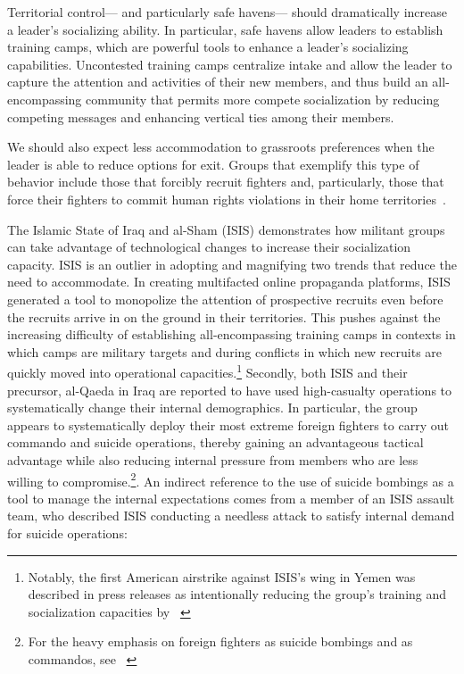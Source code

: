 Territorial control--- and particularly safe havens--- should dramatically increase a leader's socializing ability. In particular, safe havens allow leaders to establish training camps, which are powerful tools to enhance a leader's socializing capabilities. Uncontested training camps centralize intake and allow the leader to capture the attention and activities of their new members, and thus build an all-encompassing community that permits more compete socialization by reducing competing messages and enhancing vertical ties among their members.

We should also expect less accommodation to grassroots preferences when the leader is able to reduce options for exit. Groups that exemplify this type of behavior include those that forcibly recruit fighters and, particularly, those that force their fighters to commit human rights violations in their home territories~\autocite{beber2010industrial, dudenhoefer2016understanding, eck2014coercion, gates2017membership, peters2011group}.

The Islamic State of Iraq and al-Sham (ISIS) demonstrates how militant groups can take advantage of technological changes to increase their socialization capacity. ISIS is an outlier in adopting and magnifying two trends that reduce the need to accommodate. In creating multifacted online propaganda platforms, ISIS generated a tool to monopolize the attention of prospective recruits even before the recruits arrive in on the ground in their territories. This pushes against the increasing difficulty of establishing all-encompassing training camps in contexts in which camps are military targets and during conflicts in which new recruits are quickly moved into operational capacities.\footnote{Notably, the first American airstrike against ISIS's wing in Yemen was described in press releases as intentionally reducing the group's training and socialization capacities by ~\autocite{dod2017airstrike}} Secondly, both ISIS and their precursor, al-Qaeda in Iraq are reported to have used high-casualty operations to systematically change their internal demographics. In particular, the group appears to systematically deploy their most extreme foreign fighters to carry out commando and suicide operations, thereby gaining an advantageous tactical advantage while also reducing internal pressure from members who are less willing to compromise.\footnote{For the heavy emphasis on foreign fighters as suicide bombings and as commandos, see ~\cite{hafez2007suicide, reuter2015butcher, weiss2015isis}}. An indirect reference to the use of suicide bombings as a tool to manage the internal expectations comes from a member of an ISIS assault team, who described ISIS conducting a needless attack to satisfy internal demand for suicide operations:
~\autocite[163]{mironova2019freedom}

